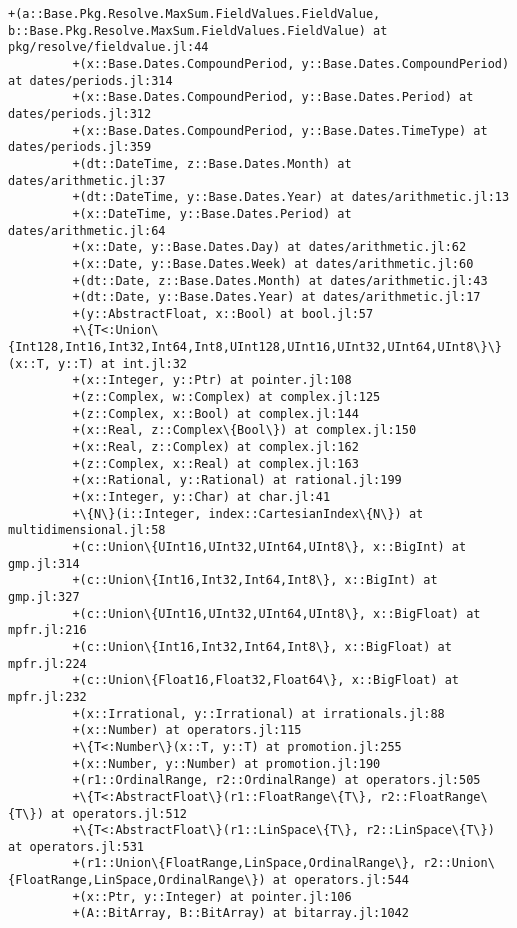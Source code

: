 \documentclass[11pt]{article}
\begin{document}
\begin{Verbatim}[commandchars=\\\{\}]
         +(a::Base.Pkg.Resolve.MaxSum.FieldValues.FieldValue, b::Base.Pkg.Resolve.MaxSum.FieldValues.FieldValue) at pkg/resolve/fieldvalue.jl:44
         +(x::Base.Dates.CompoundPeriod, y::Base.Dates.CompoundPeriod) at dates/periods.jl:314
         +(x::Base.Dates.CompoundPeriod, y::Base.Dates.Period) at dates/periods.jl:312
         +(x::Base.Dates.CompoundPeriod, y::Base.Dates.TimeType) at dates/periods.jl:359
         +(dt::DateTime, z::Base.Dates.Month) at dates/arithmetic.jl:37
         +(dt::DateTime, y::Base.Dates.Year) at dates/arithmetic.jl:13
         +(x::DateTime, y::Base.Dates.Period) at dates/arithmetic.jl:64
         +(x::Date, y::Base.Dates.Day) at dates/arithmetic.jl:62
         +(x::Date, y::Base.Dates.Week) at dates/arithmetic.jl:60
         +(dt::Date, z::Base.Dates.Month) at dates/arithmetic.jl:43
         +(dt::Date, y::Base.Dates.Year) at dates/arithmetic.jl:17
         +(y::AbstractFloat, x::Bool) at bool.jl:57
         +\{T<:Union\{Int128,Int16,Int32,Int64,Int8,UInt128,UInt16,UInt32,UInt64,UInt8\}\}(x::T, y::T) at int.jl:32
         +(x::Integer, y::Ptr) at pointer.jl:108
         +(z::Complex, w::Complex) at complex.jl:125
         +(z::Complex, x::Bool) at complex.jl:144
         +(x::Real, z::Complex\{Bool\}) at complex.jl:150
         +(x::Real, z::Complex) at complex.jl:162
         +(z::Complex, x::Real) at complex.jl:163
         +(x::Rational, y::Rational) at rational.jl:199
         +(x::Integer, y::Char) at char.jl:41
         +\{N\}(i::Integer, index::CartesianIndex\{N\}) at multidimensional.jl:58
         +(c::Union\{UInt16,UInt32,UInt64,UInt8\}, x::BigInt) at gmp.jl:314
         +(c::Union\{Int16,Int32,Int64,Int8\}, x::BigInt) at gmp.jl:327
         +(c::Union\{UInt16,UInt32,UInt64,UInt8\}, x::BigFloat) at mpfr.jl:216
         +(c::Union\{Int16,Int32,Int64,Int8\}, x::BigFloat) at mpfr.jl:224
         +(c::Union\{Float16,Float32,Float64\}, x::BigFloat) at mpfr.jl:232
         +(x::Irrational, y::Irrational) at irrationals.jl:88
         +(x::Number) at operators.jl:115
         +\{T<:Number\}(x::T, y::T) at promotion.jl:255
         +(x::Number, y::Number) at promotion.jl:190
         +(r1::OrdinalRange, r2::OrdinalRange) at operators.jl:505
         +\{T<:AbstractFloat\}(r1::FloatRange\{T\}, r2::FloatRange\{T\}) at operators.jl:512
         +\{T<:AbstractFloat\}(r1::LinSpace\{T\}, r2::LinSpace\{T\}) at operators.jl:531
         +(r1::Union\{FloatRange,LinSpace,OrdinalRange\}, r2::Union\{FloatRange,LinSpace,OrdinalRange\}) at operators.jl:544
         +(x::Ptr, y::Integer) at pointer.jl:106
         +(A::BitArray, B::BitArray) at bitarray.jl:1042

\end{Verbatim}
\end{document}
